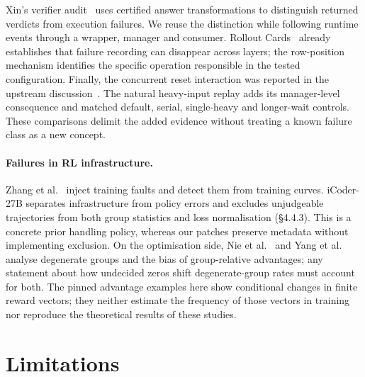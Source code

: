 \documentclass[10pt,a4paper]{article}
\let\cite\citep
\begin{document}
Xin's verifier audit~\cite{xin2026wherefails} uses certified answer
transformations to distinguish returned verdicts from execution failures.
We reuse the distinction while following runtime events through a wrapper,
manager and consumer. Rollout Cards~\cite{masters2026rolloutcards} already
establishes that failure recording can disappear across layers; the
row-position mechanism identifies the specific operation responsible in
the tested configuration. Finally, the concurrent reset interaction was
reported in the upstream discussion~\cite{verl8015discussion}. The natural
heavy-input replay adds its manager-level consequence and matched default,
serial, single-heavy and longer-wait controls. These comparisons delimit
the added evidence without treating a known failure class as a new concept.

\paragraph{Failures in RL infrastructure.}
Zhang et al.\ \cite{zhang2026rftfailure} inject training faults and detect
them from training curves. iCoder-27B \cite{yang2026icoder} separates
infrastructure from policy errors and excludes unjudgeable trajectories
from both group statistics and loss normalisation (\S4.4.3). This is a
concrete prior handling policy, whereas our patches preserve metadata
without implementing exclusion. On the
optimisation side, Nie et al.\ \cite{nie2026starvation} and Yang et al.\
\cite{yang2026biased} analyse degenerate groups and the bias of group-relative
advantages; any statement about how undecided zeros shift degenerate-group
rates must account for both. The pinned advantage examples here show
conditional changes in finite reward vectors; they neither estimate the
frequency of those vectors in training nor reproduce the theoretical
results of these studies.

\section{Limitations}
\label{sec:limitations}
\end{document}
